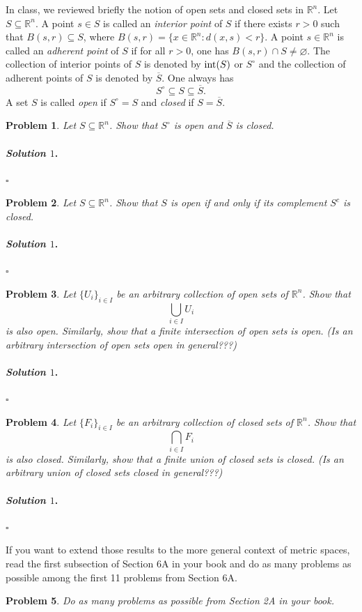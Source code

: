 \documentclass[reqno]{amsart}
\theoremstyle{plain}
\newtheorem{problem}{Problem}
\theoremstyle{definition}
\newenvironment{solution1}{\paragraph{\emph{Solution $1$}.}}{\hfill$\square$}
\begin{document}
In class, we reviewed briefly the notion of open sets and closed sets in $\mathbb{R}^{n}$.  Let $S \subseteq \mathbb{R}^{n}$.  A point $s \in S$ is called an \emph{interior point} of $S$ if there exists $r > 0$ such that $B(s,r) \subseteq S$, where $B(s,r) = \{x \in \mathbb{R}^{n}: d(x,s)< r\}$.  A point $s \in \mathbb{R}^{n}$ is called an \emph{adherent point} of $S$ if for all $r >0$, one has $B(s,r) \cap S \neq \varnothing$.  The collection of interior points of $S$ is denoted by ${\rm int}(S)$ or $S^{\circ}$ and the collection of adherent points of $S$ is denoted by $\overline{S}$.  One always has
$$S^{\circ} \subseteq S \subseteq \overline{S}. $$
A set $S$ is called \emph{open} if $S^{\circ} = S$ and \emph{closed} if $S = \overline{S}$.

\begin{problem}
Let $S \subseteq \mathbb{R}^{n}$.  Show that $S^{\circ}$ is open and $\overline{S}$ is closed.
\end{problem}
\begin{solution1}

\end{solution1}

\begin{problem}
Let $S \subseteq \mathbb{R}^{n}$.  Show that $S$ is open if and only if its complement $S^{c}$ is closed.
\end{problem}
\begin{solution1}

\end{solution1}



\begin{problem}
Let $\{U_{i}\}_{i \in I}$ be an arbitrary collection of open sets of $\mathbb{R}^{n}$.  Show that
$$\bigcup_{i \in I}U_{i} $$
is also open.  Similarly, show that a \emph{finite} intersection of open sets is open.  (Is an arbitrary intersection of open sets open in general???)
\end{problem}
\begin{solution1}

\end{solution1}

\begin{problem}
Let $\{F_{i}\}_{i \in I}$ be an arbitrary collection of closed sets of $\mathbb{R}^{n}$.  Show that
$$\bigcap_{i \in I}F_{i} $$
is also closed.  Similarly, show that a \emph{finite} union of closed sets is closed.  (Is an arbitrary union of closed sets closed in general???)
\end{problem}
\begin{solution1}

\end{solution1}

If you want to extend those results to the more general context of metric spaces, read the first subsection of Section 6A in your book and do as many problems as possible among the first 11 problems from Section 6A.

\begin{problem}
Do as many problems as possible from Section 2A in your book.
\end{problem}
\end{document}
